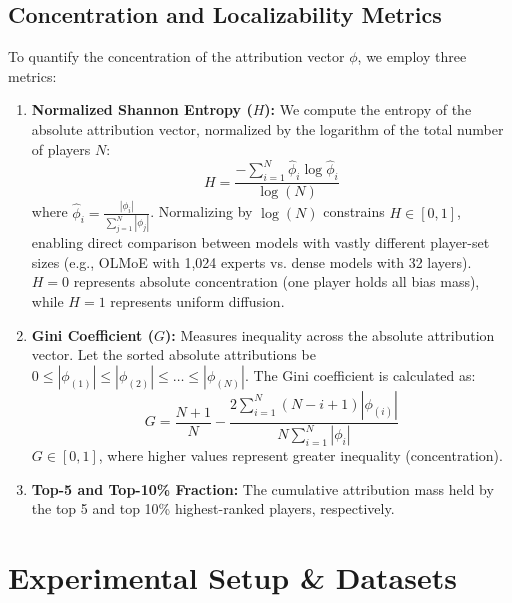 \documentclass[11pt,a4paper]{article}
\begin{document}
\subsection{Concentration and Localizability Metrics}
To quantify the concentration of the attribution vector $\phi$, we employ three metrics:
\begin{enumerate}
    \item \textbf{Normalized Shannon Entropy ($H$):} We compute the entropy of the absolute attribution vector, normalized by the logarithm of the total number of players $N$:
    $$H = \frac{-\sum_{i=1}^N \hat{\phi}_i \log \hat{\phi}_i}{\log(N)}$$
    where $\hat{\phi}_i = \frac{|\phi_i|}{\sum_{j=1}^N |\phi_j|}$. Normalizing by $\log(N)$ constrains $H \in [0, 1]$, enabling direct comparison between models with vastly different player-set sizes (e.g., OLMoE with 1,024 experts vs. dense models with 32 layers). $H=0$ represents absolute concentration (one player holds all bias mass), while $H=1$ represents uniform diffusion.
    
    \item \textbf{Gini Coefficient ($G$):} Measures inequality across the absolute attribution vector. Let the sorted absolute attributions be $0 \le |\phi_{(1)}| \le |\phi_{(2)}| \le \dots \le |\phi_{(N)}|$. The Gini coefficient is calculated as:
    $$G = \frac{N+1}{N} - \frac{2 \sum_{i=1}^N (N - i + 1) |\phi_{(i)}|}{N \sum_{i=1}^N |\phi_i|}$$
    $G \in [0, 1]$, where higher values represent greater inequality (concentration).
    
    \item \textbf{Top-5 and Top-10\% Fraction:} The cumulative attribution mass held by the top 5 and top 10\% highest-ranked players, respectively.
\end{enumerate}

\section{Experimental Setup \& Datasets}
\end{document}
